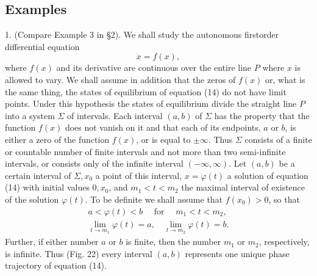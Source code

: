 \documentclass[10pt,a5paper]{book}
\theoremstyle{plain}
\theoremstyle{definition}
\theoremstyle{remark}
\begin{document}
\subsection*{Examples}
1. (Compare Example 3 in §2). We shall study the autonomous firstorder differential equation
\begin{equation*}
\dot{x}=f(x), \tag{14}
\end{equation*}
where $f(x)$ and its derivative are continuous over the entire line $P$ where $x$ is allowed to vary. We shall assume in addition that the zeros of $f(x)$ or, what is the same thing, the states of equilibrium of equation (14) do not have limit points. Under this hypothesis the states of equilibrium divide the straight line $P$ into a system $\Sigma$ of intervals. Each interval $(a, b)$ of $\Sigma$ has the property that the function $f(x)$ does not vanish on it and that each of its endpoints, $a$ or $b$, is either a zero of the function $f(x)$, or is equal to $\pm \infty$. Thus $\Sigma$ consists of a finite or countable number of finite intervals and not more than two semi-infinite intervals, or consists only of the infinite interval $(-\infty, \infty)$. Let $(a, b)$ be a certain interval of $\Sigma, x_{0}$ a point of this interval, $x=\varphi(t)$ a solution of equation (14) with initial values $0, x_{0}$, and $m_{1}<t<m_{2}$ the maximal interval of existence of the solution $\varphi(t)$. To be definite we shall assume that $f\left(x_{0}\right)>0$, so that
\begin{gather*}
a<\varphi(t)<b \quad \text { for } \quad m_{1}<t<m_{2},  \tag{15}\\
\lim _{t \rightarrow m_{1}} \varphi(t)=a, \quad \lim _{t \rightarrow m_{2}} \varphi(t)=b . \tag{16}
\end{gather*}
Further, if either number $a$ or $b$ is finite, then the number $m_{1}$ or $m_{2}$, respectively, is infinite. Thus (Fig. 22) every interval $(a, b)$ represents one unique phase trajectory of equation (14).
\end{document}

